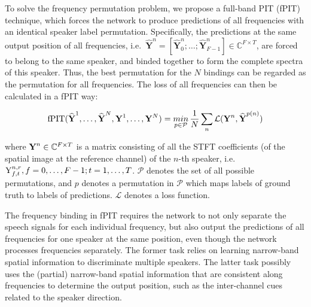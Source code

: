 \documentclass{article}
\begin{document}
To solve the frequency permutation problem, we propose a full-band PIT (fPIT) technique, which forces the network to produce predictions of all frequencies with an identical speaker label permutation. 
Specifically, the predictions at the same output position of all frequencies, 
i.e.\ $\widehat{\mathbf{Y}}^n = [\widehat{\mathbf{Y}}_0^n;\dots;\widehat{\mathbf{Y}}_{F-1}^n]\in \mathbb{C}^{F\times T}$,
are forced to belong to the same speaker, and binded together to form the complete spectra of this speaker.
Thus, the best permutation for the $N$ bindings can be regarded as the permutation for all frequencies.
The loss of all frequencies can then be calculated in a fPIT way:
\begin{small}
\begin{equation}
  \text{fPIT}(\boldsymbol{\rm \widehat{Y}}^{1},\ldots, \boldsymbol{\rm \widehat{Y}}^{N}, \boldsymbol{\rm {Y}}^{1},\ldots,\boldsymbol{\rm {Y}}^{N}) \\
  =
  \mathop{min}_{p\in \mathcal{P}}
  \frac{1}{N}
  \sum_n \mathcal{L}(
    \boldsymbol{{\rm {Y}}}^n
    ,
    \boldsymbol{{\rm \widehat{Y}}}^{p(n)}
  ) 
  \label{eq7}
\end{equation} 
\end{small}

\noindent where $\boldsymbol{{\rm {Y}}}^n \in \mathbb{C}^{F\times T}$ is a matrix consisting of all the STFT coefficients (of the spatial image at the reference channel) of the $n$-th speaker, i.e. ${\rm {Y}}_{f,t}^{n,r}, f=0,\dots,F-1; t=1,\dots,T$. 
$\mathcal{P}$ denotes the set of all possible permutations, and
$p$ denotes a permutation in $\mathcal{P}$ which maps labels of ground truth to labels of predictions.
$\mathcal{L}$ denotes a loss function.


The frequency binding in fPIT requires the network to not only separate the speech signals for each individual frequency,
but also output the predictions of all frequencies for one speaker at the same position,
even though the network processes frequencies separately.
The former task relies on learning narrow-band spatial information to discriminate multiple speakers.
The latter task possibly uses the (partial) narrow-band spatial information that are consistent along frequencies to determine the output position, such as the inter-channel cues related to the speaker direction.
\end{document}
